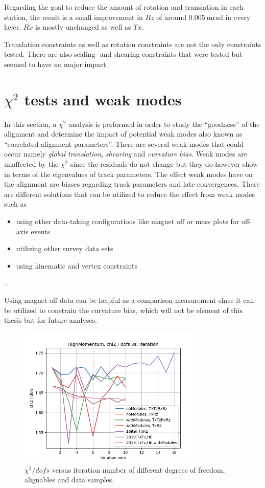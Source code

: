 Regarding the goal to reduce the amount of rotation and translation in each station,
the result is a small improvement in $Rz$ of around $\SI{0.005}{\milli\radian}$ in every layer. $Rx$ is mostly unchanged as well as $Tx$.

Translation constraints as well as rotation constraints are not the only constraints tested. There are also scaling- and shearing constraints that were tested but seemed to have no major impact.

\section{\texorpdfstring{$\chi^2$}{chi2} tests and weak modes}
In this section, a $\chi^2$ analysis is performed in order to study the ``goodness'' of the alignment and determine the impact of potential weak modes also known as ``correlated alignment parameters''. There are several weak modes that could occur namely \textit{global translation}, \textit{shearing} and \textit{curvature bias}.
Weak modes are unaffected by the $\chi^2$ since the residuals do not change but they do however show in terms of the eigenvalues of track parameters.
The effect weak modes have on the alignment are biases regarding track parameters and late convergences.
There are different solutions that can be utilized to reduce the effect from weak modes such as
\begin{itemize}
  \item using other data-taking configurations like magnet off or mass plots for off-axis events
  \item utilizing other survey data sets
  \item using kinematic and vertex constraints
\end{itemize}\,.

Using magnet-off data can be helpful as a comparison measurement since it can be utilized to constrain the curvature bias, which will not be element of this thesis but for future analyses.

\begin{figure}[htbp]
  \centering
  \includegraphics[width=0.8\textwidth]{plots/nov_19/Figure_2.png}
  \caption{$\chi^2 / dofs$ versus iteration number of different degrees of freedom, alignables and data samples.}
  \label{fig:fig2}
\end{figure}

